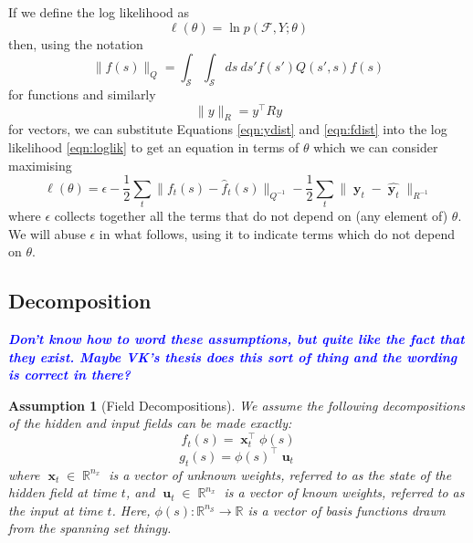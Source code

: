 \documentclass{IEEEtran}
\newcommand{\todo}[1]{\textsf{\emph{\textbf{\textcolor{blue}{#1}}}}}
\newcommand{\dist}[2]{\|#1\|_{#2}}
\DeclareMathOperator{\R}{\mathbb{R}}
\DeclareMathOperator{\xvec}{\mathbf{x}}
\DeclareMathOperator{\uvec}{\mathbf{u}}
\DeclareMathOperator{\yvec}{\mathbf{y}}
\DeclareMathOperator{\onto}{\rightarrow}
\newtheorem{assumption}{Assumption}
\begin{document}
If we define the log likelihood as
\begin{equation}
	\label{eqn:loglik}
	\ell(\theta) = \ln p(\mathcal{F}, Y;\theta)
\end{equation}
then, using the notation 
\begin{equation}
	\dist{f(s)}{Q} = \int_\mathcal{S} \int_\mathcal{S} ds~ds' f(s') Q(s',s) f(s)
\end{equation}
for functions and similarly
\begin{equation}
	\dist{y}{R} = y^\top Ry
\end{equation}
for vectors, we can substitute Equations \ref{eqn:ydist} and \ref{eqn:fdist} into the log likelihood \ref{eqn:loglik} to get an equation in terms of $\theta$ which we can consider maximising 
\begin{equation}
	\ell(\theta) =  \epsilon  - \frac{1}{2}\sum_t\dist{f_t(s) - \hat{f}_t(s)}{Q^{-1}} - \frac{1}{2}\sum_t\dist{\yvec_t-\hat{\yvec_t}}{R^{-1}}
\end{equation}
where $\epsilon$ collects together all the terms that do not depend on (any element of) $\theta$. We will abuse $\epsilon$ in what follows, using it to indicate terms which do not depend on $\theta$.

\subsection{Decomposition}

\todo{Don't know how to word these assumptions, but quite like the fact that they exist. Maybe VK's thesis does this sort of thing and the wording is correct in there?}

\begin{assumption}[Field Decompositions]
	\label{ass:fielddecomp}
	We assume the following decompositions of the hidden and input fields can be made exactly:
\begin{equation}
	f_t(s) = \xvec_t^\top\phi(s)
\end{equation}
\begin{equation}
	g_t(s) = \phi(s)^\top\uvec_t
\end{equation}	 
where $\xvec_t \in \R^{n_x}$ is a vector of unknown weights, referred to as the state of the hidden field at time $t$, and $\uvec_t \in \R^{n_x}$ is a vector of known weights, referred to as the input at time $t$. Here, $\phi(s) : \mathbb{R}^{n_\mathcal{S}} \onto \mathbb{R}$ is a vector of basis functions drawn from the spanning set thingy.
\end{assumption}
\end{document}

